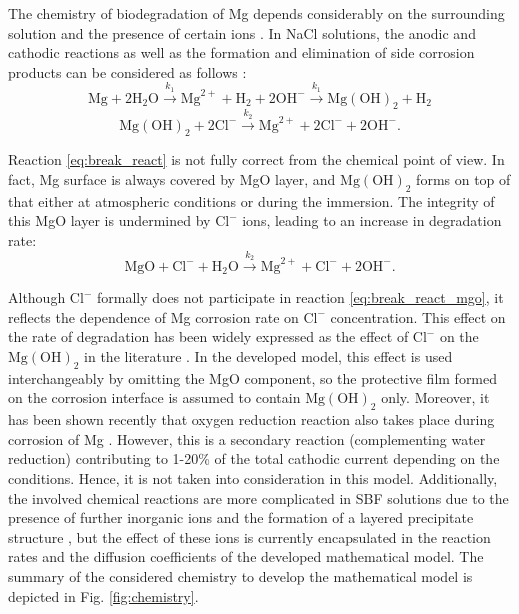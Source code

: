 The chemistry of biodegradation of Mg depends considerably on the surrounding solution and the presence of certain ions \cite{Mei2020}. In NaCl solutions, the anodic and cathodic reactions as well as the formation and elimination of side corrosion products can be considered as follows \cite{Zheng2014}:
\begin{equation} \label{eq:oxidation_react}
\mathrm{Mg}+2 \mathrm{H}_{2} \mathrm{O} \stackrel{k_{1}}{\rightarrow} \mathrm{Mg}^{2+}+\mathrm{H}_{2}+2 \mathrm{OH}^{-} \stackrel{k_{1}}{\rightarrow} \mathrm{Mg}(\mathrm{OH})_{2}+\mathrm{H}_{2}
\end{equation}
\begin{equation} \label{eq:break_react}
\mathrm{Mg}(\mathrm{OH})_{2}+2 \mathrm{Cl}^{-} \stackrel{k_{2}}{\rightarrow} \mathrm{Mg}^{2+}+2 \mathrm{Cl}^{-}+2 \mathrm{OH}^{-}.
\end{equation}

Reaction \ref{eq:break_react} is not fully correct from the chemical point of view. In fact, Mg surface is always covered by MgO layer, and $\mathrm{Mg}(\mathrm{OH})_{2}$ forms on top of that either at atmospheric conditions or during the immersion. The integrity of this MgO layer is undermined by $\mathrm{Cl}^{-}$ ions, leading to an increase in degradation rate:
\begin{equation} \label{eq:break_react_mgo}
\mathrm{MgO}+ \mathrm{Cl}^{-} + \mathrm{H}_{2} \mathrm{O} \stackrel{k_{2}}{\rightarrow} \mathrm{Mg}^{2+}+ \mathrm{Cl}^{-}+ 2\mathrm{OH}^{-}.
\end{equation}

Although $\mathrm{Cl}^{-}$ formally does not participate in reaction \ref{eq:break_react_mgo}, it reflects the dependence of Mg corrosion rate on $\mathrm{Cl}^{-}$ concentration. This effect on the rate of degradation has been widely expressed as the effect of $\mathrm{Cl}^{-}$ on the $\mathrm{Mg}(\mathrm{OH})_{2}$ in the literature \cite{Zheng2014,Zhao2017}. In the developed model, this effect is used interchangeably by omitting the MgO component, so the protective film formed on the corrosion interface is assumed to contain $\mathrm{Mg}(\mathrm{OH})_{2}$ only. Moreover, it has been shown recently that oxygen reduction reaction also takes place during corrosion of Mg \cite{Wang2020,Strebl2020,Silva2018}. However, this is a secondary reaction (complementing water reduction) contributing to 1-20\% of the total cathodic current depending on the conditions. Hence, it is not taken into consideration in this model.  Additionally, the involved chemical reactions are more complicated in SBF solutions due to the presence of further inorganic ions and the formation of a layered precipitate structure  \cite{Mei2020}, but the effect of these ions is currently encapsulated in the reaction rates and the diffusion  coefficients of the developed mathematical model. The summary of the considered chemistry to develop the mathematical model is depicted in Fig. \ref{fig:chemistry}.


